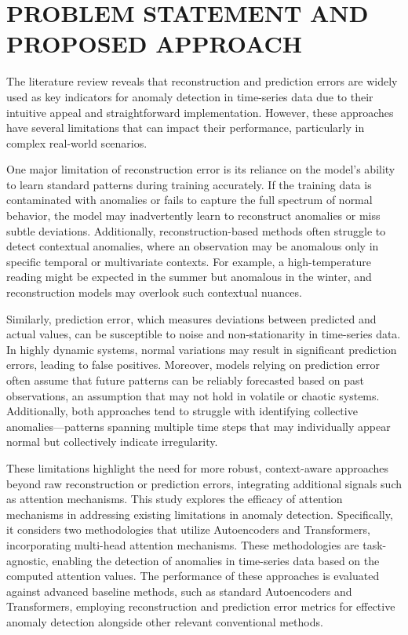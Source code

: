 \documentclass[conference]{IEEEtran}
\begin{document}
\section{PROBLEM STATEMENT AND PROPOSED APPROACH}
\label{sec:approach}

The literature review reveals that reconstruction and prediction errors are widely used as key indicators for anomaly detection in time-series data due to their intuitive appeal and straightforward implementation. However, these approaches have several limitations that can impact their performance, particularly in complex real-world scenarios.

One major limitation of reconstruction error is its reliance on the model's ability to learn standard patterns during training accurately. If the training data is contaminated with anomalies or fails to capture the full spectrum of normal behavior, the model may inadvertently learn to reconstruct anomalies or miss subtle deviations. Additionally, reconstruction-based methods often struggle to detect contextual anomalies, where an observation may be anomalous only in specific temporal or multivariate contexts. For example, a high-temperature reading might be expected in the summer but anomalous in the winter, and reconstruction models may overlook such contextual nuances.

Similarly, prediction error, which measures deviations between predicted and actual values, can be susceptible to noise and non-stationarity in time-series data. In highly dynamic systems, normal variations may result in significant prediction errors, leading to false positives. Moreover, models relying on prediction error often assume that future patterns can be reliably forecasted based on past observations, an assumption that may not hold in volatile or chaotic systems. Additionally, both approaches tend to struggle with identifying collective anomalies—patterns spanning multiple time steps that may individually appear normal but collectively indicate irregularity.

These limitations highlight the need for more robust, context-aware approaches beyond raw reconstruction or prediction errors, integrating additional signals such as attention mechanisms.
This study explores the efficacy of attention mechanisms in addressing existing limitations in anomaly detection. Specifically, it considers two methodologies that utilize Autoencoders and Transformers, incorporating multi-head attention mechanisms. These methodologies are task-agnostic, enabling the detection of anomalies in time-series data based on the computed attention values. The performance of these approaches is evaluated against advanced baseline methods, such as standard Autoencoders and Transformers, employing reconstruction and prediction error metrics for effective anomaly detection alongside other relevant conventional methods.
\end{document}
